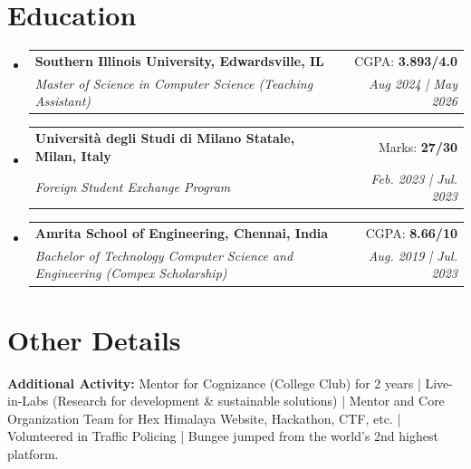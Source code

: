 \documentclass[letter,12pt]{article}
\makeatletter
\newcommand{\resumeSubheading}[4]{
  \vspace{-2pt}\item
    \begin{tabular*}{0.97\textwidth}[t]{l@{\extracolsep{\fill}}r}
      \textbf{#1} & #2 \\
      \textit{\small#3} & \textit{\small #4} \\
    \end{tabular*}\vspace{-7pt}
}
\newcommand{\resumeSubHeadingListStart}{\begin{itemize}[leftmargin=0.15in, label={}]}
\newcommand{\resumeSubHeadingListEnd}{\end{itemize}}
\makeatother
\begin{document}
\section{Education}
\resumeSubHeadingListStart
\resumeSubheading
{Southern Illinois University, Edwardsville, IL}{CGPA: \textbf{3.893/4.0}}
{Master of Science in Computer Science (Teaching Assistant)}{Aug 2024 | May 2026}
\resumeSubheading
{Università degli Studi di Milano Statale, Milan, Italy}{Marks: \textbf{27/30} }
{Foreign Student Exchange Program}{Feb. 2023 | Jul. 2023}
\resumeSubheading
{Amrita School of Engineering, Chennai, India}{CGPA: \textbf{8.66/10}}
{Bachelor of Technology Computer Science and Engineering (Compex Scholarship)}{Aug. 2019 | Jul. 2023}
\resumeSubHeadingListEnd



\section{Other Details}
\begin{itemize}[leftmargin=0.15in, label={}]
	\setlength\itemsep{-2pt}
	\small{
 \item{
		\textbf{Additional Activity:}{ Mentor for Cognizance (College Club) for 2 years | Live-in-Labs (Research for development \& sustainable solutions) | Mentor and Core Organization Team for Hex Himalaya Website, Hackathon, CTF, etc.} | Volunteered in Traffic Policing |  Bungee jumped from the world's 2nd highest platform. \\
		}

 }
\end{itemize}

\end{document}
